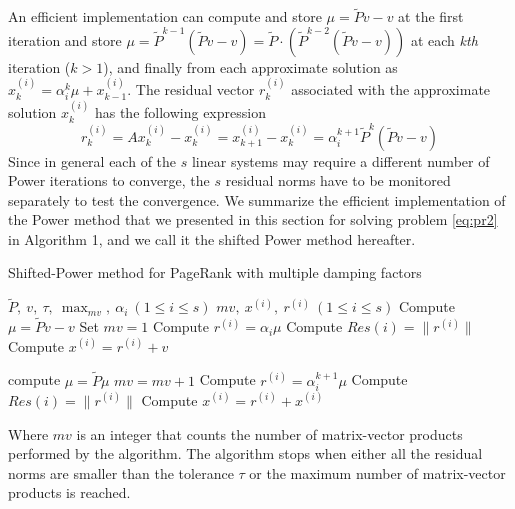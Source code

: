 \documentclass[12pt]{article}
\begin{document}
\noindent An efficient implementation can compute and store $\mu = \tilde Pv -v$ at the first iteration and store $\mu = \tilde P^{k-1}(\tilde P v - v) = \tilde P \cdot (\tilde P^{k-2}(\tilde P v - v))$ at each \emph{kth} iteration ($k  > 1$), and finally from each approximate solution as $x_k^{(i)} = \alpha_i^k \mu + x_{k-1}^{(i)}$. The residual vector $r_k^{(i)}$ associated with the approximate solution $x_k^{(i)}$ has the following expression
\begin{equation}
    r_k^{(i)} = A x_k^{(i)} - x_k^{(i)} = x_{k+1}^{(i)} - x_k^{(i)} = \alpha_i^{k+1} \tilde P^k (\tilde P v - v)
\end{equation}
Since in general each of the $s$ linear systems may require a different number of Power iterations to converge, the $s$ residual norms have to be monitored separately to test the convergence. We summarize the efficient implementation of the Power method that we presented in this section for solving problem \ref{eq:pr2} in Algorithm 1, and we call it the shifted Power method hereafter.

\begin{algorithm}
    \caption{Shifted-Power method for PageRank with multiple damping factors}\label{alg:algo1}
    \begin{algorithmic}
        \Require $\tilde P, ~v, ~\tau, ~\max_{mv}, ~\alpha_i ~ (1 \leq i \leq s)$
        \Ensure $mv,~ x^{(i)},~ r^{(i)} ~ (1 \leq i \leq s)$
        \State Compute $\mu = \tilde P v - v$
        \State Set $mv =1$
            \State Compute $r^{(i)} = \alpha_i \mu$
            \State Compute $Res(i) = \lVert r^{(i)} \rVert$
                \State Compute $x^{(i)} = r^{(i)} + v$
            \EndIf
        \EndFor

            \State compute $\mu = \tilde P \mu$
            \State $mv = mv + 1$
                    \State Compute $r^{(i)} = \alpha_i^{k+1} \mu$
                    \State Compute $Res(i) = \lVert r^{(i)} \rVert$
                        \State Compute $x^{(i)} = r^{(i)} + x^{(i)}$
                    \EndIf
                \EndIf
            \EndFor
        \EndWhile
    \end{algorithmic}
\end{algorithm}

\noindent Where $mv$ is an integer that counts the number of matrix-vector products performed by the algorithm. The algorithm stops when either all the residual norms are smaller than the tolerance $\tau$ or the maximum number of matrix-vector products is reached.



\clearpage


\nocite{*}
\end{document}

